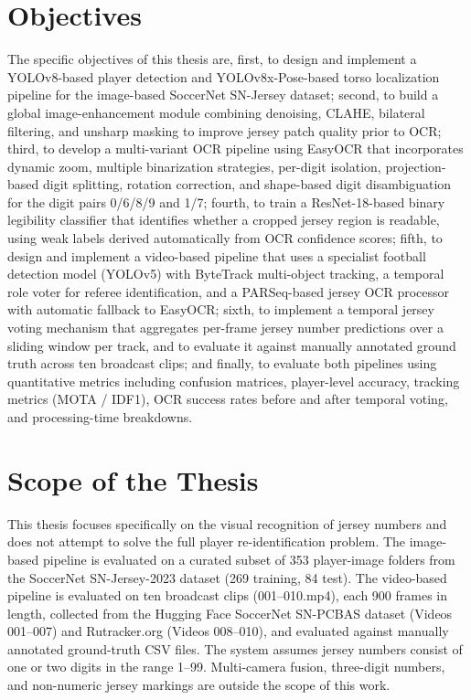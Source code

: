 \section{Objectives}
\label{sec:objectives}

The specific objectives of this thesis are, first, to design and
implement a YOLOv8-based player detection and YOLOv8x-Pose-based torso
localization pipeline for the image-based SoccerNet SN-Jersey dataset;
second, to build a global image-enhancement module combining
denoising, CLAHE, bilateral filtering, and unsharp masking to improve
jersey patch quality prior to OCR; third, to develop a multi-variant
OCR pipeline using EasyOCR that incorporates dynamic zoom, multiple
binarization strategies, per-digit isolation, projection-based digit
splitting, rotation correction, and shape-based digit disambiguation
for the digit pairs 0/6/8/9 and 1/7; fourth, to train a ResNet-18-based
binary legibility classifier that identifies whether a cropped jersey
region is readable, using weak labels derived automatically from OCR
confidence scores; fifth, to design and implement a video-based
pipeline that uses a specialist football detection model (YOLOv5) with
ByteTrack multi-object tracking, a temporal role voter for referee
identification, and a PARSeq-based jersey OCR processor with automatic
fallback to EasyOCR; sixth, to implement a temporal jersey voting
mechanism that aggregates per-frame jersey number predictions over a
sliding window per track, and to evaluate it against manually
annotated ground truth across ten broadcast clips; and finally, to
evaluate both pipelines using quantitative metrics including confusion
matrices, player-level accuracy, tracking metrics (MOTA / IDF1), OCR
success rates before and after temporal voting, and processing-time
breakdowns.

\section{Scope of the Thesis}
\label{sec:scope}

This thesis focuses specifically on the visual recognition of jersey
numbers and does not attempt to solve the full player re-identification
problem. The image-based pipeline is evaluated on a curated subset of
353 player-image folders from the SoccerNet SN-Jersey-2023 dataset (269
training, 84 test). The video-based pipeline is evaluated on ten
broadcast clips (001--010.mp4), each 900 frames in length, collected
from the Hugging Face SoccerNet SN-PCBAS dataset (Videos 001--007) and
Rutracker.org (Videos 008--010), and evaluated against manually
annotated ground-truth CSV files. The system assumes jersey numbers
consist of one or two digits in the range 1--99. Multi-camera fusion,
three-digit numbers, and non-numeric jersey markings are outside the
scope of this work.

